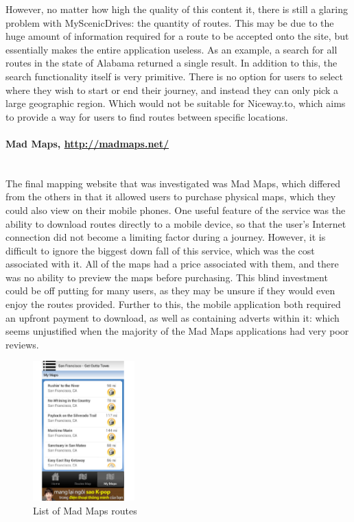 \vspace{5mm}
\noindent 
However, no matter how high the quality of this content it, there is still a glaring problem with MyScenicDrives: the quantity of routes. This may be due to the huge amount of information required for a route to be accepted onto the site, but essentially makes the entire application useless. As an example, a search for all routes in the state of Alabama returned a single result. In addition to this, the search functionality itself is very primitive. There is no option for users to select where they wish to start or end their journey, and instead they can only pick a large geographic region. Which would not be suitable for Niceway.to, which aims to provide a way for users to find routes between specific locations.
\ \\
\paragraph{Mad Maps, \url{http://madmaps.net/}}\ \\
The final mapping website that was investigated was Mad Maps, which differed from the others in that it allowed users to purchase physical maps, which they could also view on their mobile phones. One useful feature of the service was the ability to download routes directly to a mobile device, so that the user's Internet connection did not become a limiting factor during a journey. However, it is difficult to ignore the biggest down fall of this service, which was the cost associated with it. All of the maps had a price associated with them, and there was no ability to preview the maps before purchasing. This blind investment could be off putting for many users, as they may be unsure if they would even enjoy the routes provided. Further to this, the mobile application both required an upfront payment to download, as well as containing adverts within it: which seems unjustified when the majority of the Mad Maps applications had very poor reviews.
\begin{figure}
	\vspace{-1mm}
	\hspace{5mm}
	\includegraphics[width=0.35\textwidth]{images/background/mm_rlp.png}
	\centering
	\caption{List of Mad Maps routes}	
	\vspace{-40mm}
\end{figure}

